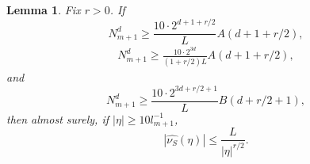 \documentclass[12pt,reqno]{article}
\numberwithin{equation}{section}
\newtheorem{lemma}[theorem]{Lemma}
\begin{document}
\begin{lemma} \label{largeFrequencyLemma}
    Fix $r > 0$. If
    \begin{equation} \label{equation129041902412901290129}
        N_{m+1}^d \geq \frac{10 \cdot 2^{d+1+r/2}}{L} A(d + 1 + r/2),
    \end{equation}
    \begin{equation} \label{equation190512919204912901}
    \begin{split}
        N_{m+1}^d \geq \frac{10 \cdot 2^{3d}}{(1 + r/2) L} A(d + 1 + r/2),
    \end{split}
    \end{equation}
    and
    \begin{equation} \label{equation68943893493849}
        N_{m+1}^d \geq \frac{10 \cdot 2^{3d + r/2 + 1}}{L} B(d + r/2 + 1),
    \end{equation}
    then almost surely, if $|\eta| \geq 10l_{m+1}^{-1}$,
    \[ |\widehat{\nu_S}(\eta)| \leq \frac{L}{|\eta|^{r/2}}. \]
\end{lemma}
\end{document}
